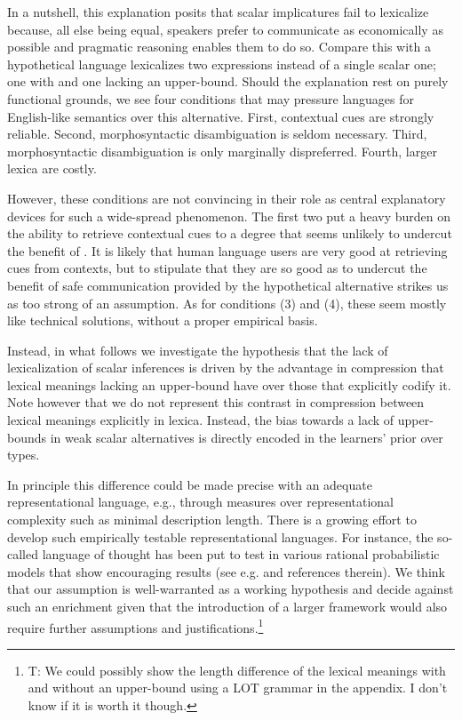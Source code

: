 \documentclass[a4paper]{article}
\newcommand{\hl}[1]{\textcolor[rgb]{.8,.33,.0}{#1}}%
\begin{document}
In a nutshell, this explanation posits that scalar implicatures fail to lexicalize because, all else being equal, speakers prefer to communicate as economically as possible and pragmatic reasoning enables them to do so. Compare this with a hypothetical language lexicalizes two expressions instead of a single scalar one; one with and one lacking an upper-bound. Should the explanation rest on purely functional grounds, we see four conditions that may pressure languages for English-like semantics over this alternative. First, contextual cues are strongly reliable. Second, morphosyntactic disambiguation is seldom necessary. Third, morphosyntactic disambiguation is only marginally dispreferred. Fourth, larger lexica are costly. 

However, these conditions are not convincing in their role as central explanatory devices for such a wide-spread phenomenon. The first two put a heavy burden on the ability to retrieve contextual cues to a degree that seems unlikely to undercut the benefit of . It is likely that human language users are very good at retrieving cues from contexts, but to stipulate that they are so good as to undercut the benefit of safe communication provided by the hypothetical alternative strikes us as too strong of an assumption.  As for conditions (3) and (4), these seem mostly like technical solutions, without a proper empirical basis. 

Instead, in what follows we investigate the hypothesis that the lack of lexicalization of scalar inferences is driven by the advantage in compression that lexical meanings lacking an upper-bound have over those that explicitly codify it. Note however that we do not represent this contrast in compression between lexical meanings explicitly in lexica. Instead, the bias towards a lack of upper-bounds in weak scalar alternatives is directly encoded in the learners' prior over types.

 In principle this difference could be made precise with an adequate representational language, e.g., through measures over representational complexity such as minimal description length.  There is a growing effort to develop such empirically  testable  representational  languages. For  instance, the so-called language of thought has been put to test in various rational probabilistic models that show encouraging results (see e.g. \citealt{katz+etal:2008, piantadosi+etal:underreview, piantadosi+etal:2012} and references therein). We think that our assumption is well-warranted as a working hypothesis and decide against such an enrichment given that the introduction of a larger framework would also require further assumptions and justifications.\footnote{\hl{T: We could possibly show the length difference of the lexical meanings with and without an upper-bound using a LOT grammar in the appendix. I don't know if it is worth it though.}}
\end{document}
